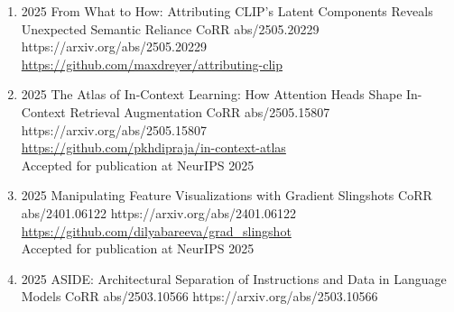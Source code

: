 {\begin{enumerate}
    
        \item {}
                        {2025}
                        {From What to How: Attributing CLIP's Latent Components Reveals Unexpected Semantic Reliance}
                        {CoRR abs/2505.20229}
                        {https://arxiv.org/abs/2505.20229}
                        {
                            \\\href{https://github.com/maxdreyer/attributing-clip}{https://github.com/maxdreyer/attributing-clip}
                        }
             
             
        \item {}
                        {2025}
                        {The Atlas of In-Context Learning: How Attention Heads Shape In-Context Retrieval Augmentation}
                        {CoRR abs/2505.15807}
                        {https://arxiv.org/abs/2505.15807}
                        {
                            \\\href{https://github.com/pkhdipraja/in-context-atlas}{https://github.com/pkhdipraja/in-context-atlas}
                            \\Accepted for publication at NeurIPS 2025
                        }




        \item {}
                        {2025}
                        {Manipulating Feature Visualizations with Gradient Slingshots}
                        {CoRR abs/2401.06122}
                        {https://arxiv.org/abs/2401.06122}
                        {
                             \\\href{https://github.com/dilyabareeva/grad_slingshot}{https://github.com/dilyabareeva/grad\_slingshot}
                             \\Accepted for publication at NeurIPS 2025
                        }

    
        \item {}
                        {2025}
                        {ASIDE: Architectural Separation of Instructions and Data in Language Models}
                        {CoRR abs/2503.10566}
                        {https://arxiv.org/abs/2503.10566}    
                        

\end{enumerate}}
